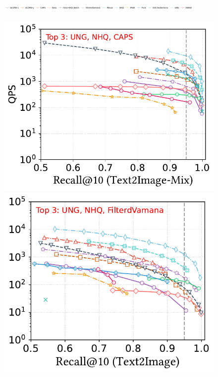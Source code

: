 \documentclass[sigconf, nonacm]{acmart}
\begin{document}
{	%
	
\begin{figure}
	\centering
	
	\includegraphics[width=0.9\textwidth]{figures/exp/attribute_legend.pdf}
	
	\begin{minipage}[t]{0.38\textwidth}
		\centering
		\includegraphics[width=0.495\linewidth]{figures/exp/attribute_multimodel.pdf}
		\hfill 
		\includegraphics[width=0.47\linewidth]{figures/exp/attribute_multimodel_1.pdf}
		

\end{minipage}
\end{figure}}
\end{document}
